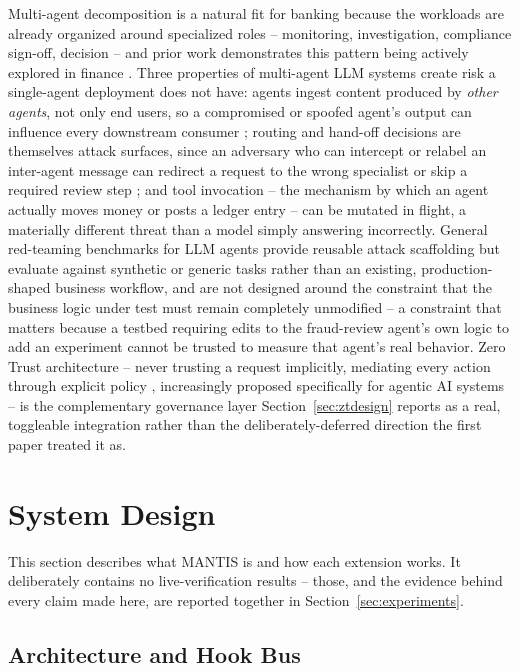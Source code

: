 \documentclass[conference]{IEEEtran}
\begin{document}
Multi-agent decomposition is a natural fit for banking because the workloads are already organized around specialized roles -- monitoring, investigation, compliance sign-off, decision -- and prior work demonstrates this pattern being actively explored in finance \cite{anomaly_detection_finance, masca_credit}. Three properties of multi-agent LLM systems create risk a single-agent deployment does not have: agents ingest content produced by \emph{other agents}, not only end users, so a compromised or spoofed agent's output can influence every downstream consumer \cite{prompt_infection}; routing and hand-off decisions are themselves attack surfaces, since an adversary who can intercept or relabel an inter-agent message can redirect a request to the wrong specialist or skip a required review step \cite{aitm_communication_attacks}; and tool invocation -- the mechanism by which an agent actually moves money or posts a ledger entry -- can be mutated in flight, a materially different threat than a model simply answering incorrectly. General red-teaming benchmarks for LLM agents \cite{redagentbench} provide reusable attack scaffolding but evaluate against synthetic or generic tasks rather than an existing, production-shaped business workflow, and are not designed around the constraint that the business logic under test must remain completely unmodified -- a constraint that matters because a testbed requiring edits to the fraud-review agent's own logic to add an experiment cannot be trusted to measure that agent's real behavior. Zero Trust architecture -- never trusting a request implicitly, mediating every action through explicit policy \cite{nist_zero_trust}, increasingly proposed specifically for agentic AI systems \cite{zero_trust_agentic_identity} -- is the complementary governance layer Section~\ref{sec:ztdesign} reports as a real, toggleable integration rather than the deliberately-deferred direction the first paper treated it as.

\section{System Design}
\label{sec:design}

This section describes what MANTIS is and how each extension works. It deliberately contains no live-verification results -- those, and the evidence behind every claim made here, are reported together in Section~\ref{sec:experiments}.

\subsection{Architecture and Hook Bus}
\label{sec:arch}
\end{document}
